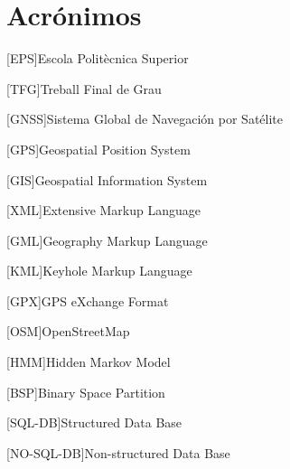 \chapter{Acrónimos} %
%
%
\begin{acronym}

[EPS]{Escola Politècnica Superior}

[TFG]{Treball Final de Grau}

[GNSS]{Sistema Global de Navegación por Satélite}

[GPS]{Geospatial Position System}

[GIS]{Geospatial Information System}

[XML]{Extensive Markup Language}

[GML]{Geography Markup Language}

[KML]{Keyhole Markup Language}

[GPX]{GPS eXchange Format}

[OSM]{OpenStreetMap}

[HMM]{Hidden Markov Model}

[BSP]{Binary Space Partition}

[SQL-DB]{Structured Data Base}

[NO-SQL-DB]{Non-structured Data Base}


\end{acronym}
